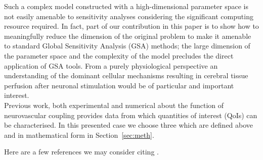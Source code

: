Such a complex model constructed with a high-dimensional parameter space is not easily amenable to sensitivity analyses considering the significant computing resource required. In fact, part of our contribution in this paper is to show how to meaningfully reduce the dimension of the original problem to make it amenable to standard Global Sensitivity Analysis (GSA) methods; the large dimension of the parameter space and the complexity of the model precludes the  direct application of GSA tools.
From a purely physiological perspective an understanding of the dominant cellular mechanisms resulting in cerebral tissue perfusion after neuronal stimulation would be of particular and important interest.\\
Previous work, both experimental and numerical about the function of neurovascular coupling provides data from which quantities of interest (QoIs) can be characterised. In this presented case we choose three which are defined above and in mathematical form in Section~\ref{sec:meth}. 

  
  
Here are a few references we may consider citing  \cite{gsa_pharm,lr_gsa,uqpy,Witthoft2013}.
